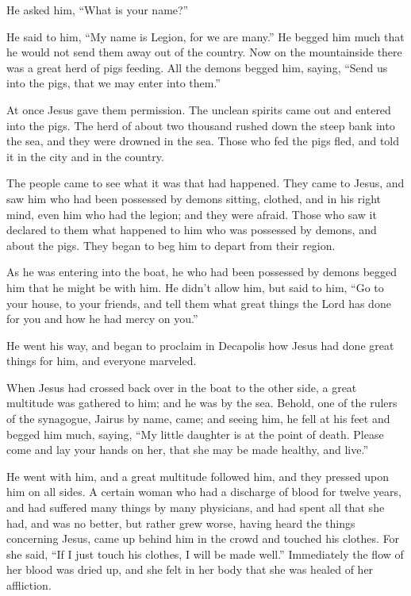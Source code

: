  He asked him, ``What is your name?''

He said to him, ``My name is Legion, for we are many.''  He
begged him much that he would not send them away out of the country.
 Now on the mountainside there was a great herd of pigs
feeding.  All the demons begged him, saying, ``Send us into
the pigs, that we may enter into them.''

 At once Jesus gave them permission. The unclean spirits
came out and entered into the pigs. The herd of about two thousand
rushed down the steep bank into the sea, and they were drowned in the
sea.  Those who fed the pigs fled, and told it in the city
and in the country.

The people came to see what it was that had happened.  They
came to Jesus, and saw him who had been possessed by demons sitting,
clothed, and in his right mind, even him who had the legion; and they
were afraid.  Those who saw it declared to them what
happened to him who was possessed by demons, and about the pigs.
 They began to beg him to depart from their region.

 As he was entering into the boat, he who had been
possessed by demons begged him that he might be with him. 
He didn't allow him, but said to him, ``Go to your house, to your
friends, and tell them what great things the Lord has done for you and
how he had mercy on you.''

 He went his way, and began to proclaim in Decapolis how
Jesus had done great things for him, and everyone marveled.

 When Jesus had crossed back over in the boat to the other
side, a great multitude was gathered to him; and he was by the sea.
 Behold, one of the rulers of the synagogue, Jairus by
name, came; and seeing him, he fell at his feet  and begged
him much, saying, ``My little daughter is at the point of death. Please
come and lay your hands on her, that she may be made healthy, and
live.''

 He went with him, and a great multitude followed him, and
they pressed upon him on all sides.  A certain woman who
had a discharge of blood for twelve years,  and had
suffered many things by many physicians, and had spent all that she had,
and was no better, but rather grew worse,  having heard the
things concerning Jesus, came up behind him in the crowd and touched his
clothes.  For she said, ``If I just touch his clothes, I
will be made well.''  Immediately the flow of her blood was
dried up, and she felt in her body that she was healed of her
affliction.

